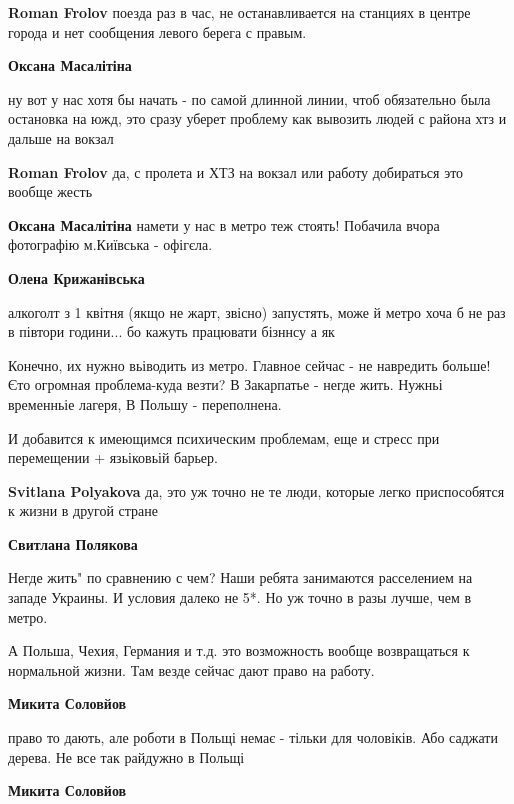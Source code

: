 \begin{itemize}
\begin{itemize}
\textbf{Roman Frolov} поезда раз в час, не останавливается на станциях в центре города и нет сообщения левого берега с правым.

\textbf{Оксана Масалітіна} 

ну вот у нас хотя бы начать - по самой длинной линии, чтоб обязательно была
остановка на южд, это сразу уберет проблему как вывозить людей с района хтз и
дальше на вокзал

\textbf{Roman Frolov} да, с пролета и ХТЗ на вокзал или работу добираться это вообще жесть

\textbf{Оксана Масалітіна} намети у нас в метро теж стоять! Побачила вчора фотографію м.Київська - офігєла.

\textbf{Олена Крижанівська} 

алкоголт з 1 квітня (якщо не жарт, звісно) запустять, може й метро хоча б не
раз в півтори години... бо кажуть працювати бізннсу а як

\end{itemize} %


Конечно, их нужно вьіводить из метро. Главное сейчас - не навредить больше! Єто
огромная проблема-куда везти? В Закарпатье - негде жить. Нужньі временньіе лагеря,
В Польшу - переполнена.

И добавится к имеющимся психическим проблемам, еще и стресс при перемещении + язьіковьій барьер.

\begin{itemize} %
\textbf{Svitlana Polyakova} да, это уж точно не те люди, которые легко приспособятся к жизни в другой стране

\textbf{Свитлана Полякова} 

Негде жить" по сравнению с чем? Наши ребята занимаются расселением на западе
Украины. И условия далеко не 5*. Но уж точно в разы лучше, чем в метро.

А Польша, Чехия, Германия и т.д. это возможность вообще возвращаться к
нормальной жизни. Там везде сейчас дают право на работу.

\textbf{Микита Соловйов} 

право то дають, але роботи в Польщі немає - тільки для чоловіків. Або саджати
дерева. Не все так райдужно в Польщі

\textbf{Микита Соловйов} 


\end{itemize}
\end{itemize}
